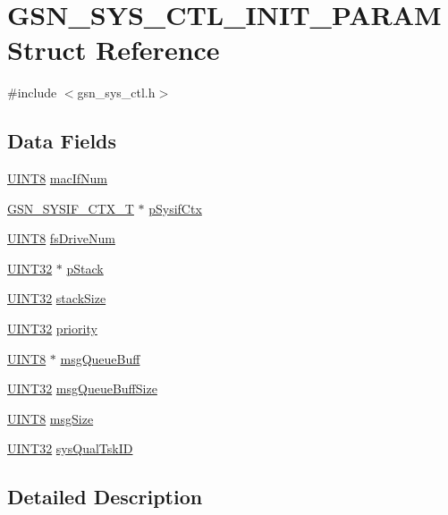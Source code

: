 \hypertarget{a00249}{
\section{GSN\_\-SYS\_\-CTL\_\-INIT\_\-PARAM Struct Reference}
\label{a00249}
}


{\ttfamily \#include $<$gsn\_\-sys\_\-ctl.h$>$}

\subsection*{Data Fields}
\begin{DoxyCompactItemize}
\item 
\hyperlink{a00660_gab27e9918b538ce9d8ca692479b375b6a}{UINT8} \hyperlink{a00249_ae57ae92e651751e7978e237c55133b4c}{macIfNum}
\item 
\hyperlink{a00261}{GSN\_\-SYSIF\_\-CTX\_\-T} $\ast$ \hyperlink{a00249_a48d2f968a8bd5038d7077bf2e4384997}{pSysifCtx}
\item 
\hyperlink{a00660_gab27e9918b538ce9d8ca692479b375b6a}{UINT8} \hyperlink{a00249_a608e9ec21e3e188328d47a7bba1483ec}{fsDriveNum}
\item 
\hyperlink{a00660_gae1e6edbbc26d6fbc71a90190d0266018}{UINT32} $\ast$ \hyperlink{a00249_a06dc12db7ec3c52d8dc551e9e8f77e63}{pStack}
\item 
\hyperlink{a00660_gae1e6edbbc26d6fbc71a90190d0266018}{UINT32} \hyperlink{a00249_a82cabdcaee43fc729a1da5551d429f73}{stackSize}
\item 
\hyperlink{a00660_gae1e6edbbc26d6fbc71a90190d0266018}{UINT32} \hyperlink{a00249_a4eb2b736accd00141e11004adc0fded0}{priority}
\item 
\hyperlink{a00660_gab27e9918b538ce9d8ca692479b375b6a}{UINT8} $\ast$ \hyperlink{a00249_a7e51f5f5131592004e739bcc100a27fc}{msgQueueBuff}
\item 
\hyperlink{a00660_gae1e6edbbc26d6fbc71a90190d0266018}{UINT32} \hyperlink{a00249_a21640f5a1df0caa651f4ffe4280d6210}{msgQueueBuffSize}
\item 
\hyperlink{a00660_gab27e9918b538ce9d8ca692479b375b6a}{UINT8} \hyperlink{a00249_aafd0a2e6e8c7d8ff4ee52626581abe6f}{msgSize}
\item 
\hyperlink{a00660_gae1e6edbbc26d6fbc71a90190d0266018}{UINT32} \hyperlink{a00249_a3e06cb8fa58f49b7004a85c6f387ddc7}{sysQualTskID}
\end{DoxyCompactItemize}


\subsection{Detailed Description}


